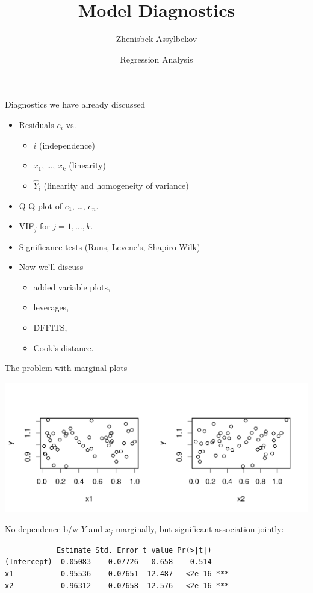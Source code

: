 \documentclass{beamer}
\title{Model Diagnostics}
\author{Zhenisbek Assylbekov}
\institute{Department of Mathematics}
\date{Regression Analysis}
\begin{document}
\begin{frame}
  \titlepage
\end{frame}

\begin{frame}{Diagnostics we have already discussed}
\begin{itemize}
\item Residuals $e_i$ vs. 
\begin{itemize}
    \item $i$ (independence)
    \item $x_1$, \ldots , $x_k$ (linearity)
    \item $\hat{Y}_i$ (linearity and homogeneity of variance)
\end{itemize} 
\item\pause Q-Q plot of $e_1$, \ldots , $e_n$.
\item\pause VIF$_j$ for $j = 1, \ldots, k$.
\item\pause Significance tests (Runs, Levene's, Shapiro-Wilk)
\item\pause Now we'll discuss 
\begin{itemize}
    \item added variable plots,
    \item leverages,
    \item DFFITS,
    \item Cook's distance.
\end{itemize}
\end{itemize}
\end{frame}

\begin{frame}[fragile]{The problem with marginal plots}
\begin{center}
\includegraphics[height=.4\textheight]{plots/marginal.pdf}    
\end{center}
\pause No dependence b/w $Y$ and $x_j$ marginally, but significant association jointly:
\begin{footnotesize}
\pause\begin{verbatim}
            Estimate Std. Error t value Pr(>|t|)    
(Intercept)  0.05083    0.07726   0.658    0.514    
x1           0.95536    0.07651  12.487   <2e-16 ***
x2           0.96312    0.07658  12.576   <2e-16 ***
\end{verbatim}
\end{footnotesize}
\end{frame}
\end{document}
